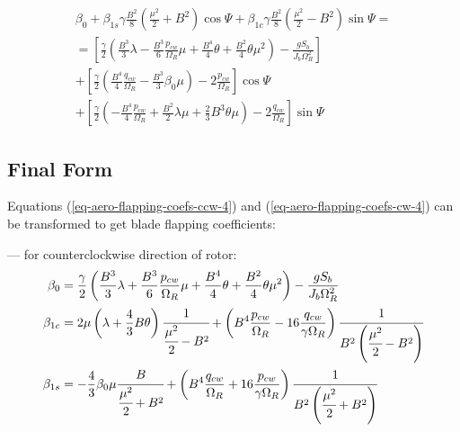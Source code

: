 \begin{multline}
  \label{eq-aero-flapping-coefs-cw-4}
  \beta_0
  +
  \beta_{1s} \gamma \frac{B^2}{8}
  \left( \frac{\mu^2}{2} + B^2 \right) \cos \Psi
  +
  \beta_{1c} \gamma \frac{B^2}{8}
  \left( \frac{\mu^2}{2} - B^2 \right) \sin \Psi
  = \\ =
  \left[
    \frac{\gamma}{2}
    \left(
        \frac{B^3}{3} \lambda
      - \frac{B^3}{6} \frac{p_{cw}}{\Omega_R} \mu
      + \frac{B^4}{4} \theta
      + \frac{B^2}{4} \theta \mu^2
    \right) - \frac{ g S_b }{ J_b \Omega_R^2 }
  \right]
  \\
  + \left[
    \frac{\gamma}{2}
    \left(
      \frac{B^4}{4} \frac{q_{cw}}{\Omega_R}
      - \frac{B^3}{3} \beta_0 \mu
    \right) - 2 \frac{p_{cw}}{\Omega_R}
  \right] \cos \Psi
  \\
  + \left[
    \frac{\gamma}{2}
    \left(
      - \frac{B^4}{4} \frac{p_{cw}}{\Omega_R}
      + \frac{B^2}{2} \lambda \mu
      + \frac{2}{3} B^3 \theta \mu
    \right) - 2 \frac{q_{cw}}{\Omega_R}
  \right] \sin \Psi
\end{multline}

\clearpage

\subsection{Final Form}

Equations (\ref{eq-aero-flapping-coefs-ccw-4}) and (\ref{eq-aero-flapping-coefs-cw-4}) can be transformed to get blade flapping coefficients:

--- for counterclockwise direction of rotor:
\begin{align}
  \beta_0 &=
  \frac{\gamma}{2}
  \left(
      \frac{B^3}{3} \lambda 
    + \frac{B^3}{6} \frac{p_{cw}}{\Omega_R} \mu
    + \frac{B^4}{4} \theta
    + \frac{B^2}{4} \theta \mu^2
  \right) - \frac{ g S_b }{ J_b \Omega_R^2 }
  \\
  \beta_{1c} &=
  2 \mu \left( \lambda + \frac{4}{3} B \theta \right)
  \cfrac{1}{\cfrac{\mu^2}{2} - B^2}
  +
  \left(
      B^4 \frac{p_{cw}}{\Omega_R}
    - 16 \frac{q_{cw}}{\gamma \Omega_R}
  \right)
  \cfrac{1}{B^2\left(\cfrac{\mu^2}{2}-B^2\right)}
  \\
  \beta_{1s} &=
  - \frac{4}{3} \beta_0 \mu
  \cfrac{B}{\cfrac{\mu^2}{2} + B^2}
  +
  \left(
      B^4 \frac{q_{cw}}{\Omega_R} 
    + 16 \frac{p_{cw}}{\gamma \Omega_R}
  \right)
  \cfrac{1}{B^2 \left(\cfrac{\mu^2}{2}+B^2\right)}
\end{align}

